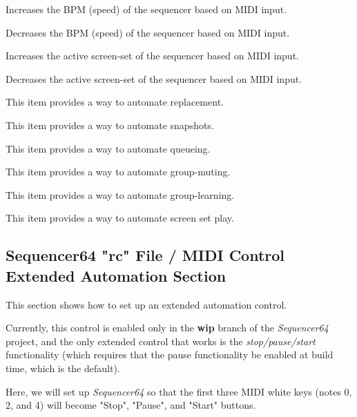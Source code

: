    Increases the BPM (speed) of the sequencer based on MIDI input.

   Decreases the BPM (speed) of the sequencer based on MIDI input.

   Increases the active screen-set of the sequencer based on MIDI input.

   Decreases the active screen-set of the sequencer based on MIDI input.

   This item provides a way to automate replacement.

   This item provides a way to automate snapshots.

   This item provides a way to automate queueing.

   This item provides a way to automate group-muting.

   This item provides a way to automate group-learning.

   This item provides a way to automate screen set play.

\subsection{Sequencer64 "rc" File / MIDI Control Extended Automation Section}
\label{subsubsec:seq64_rc_file_midi_control_extended_automation_group}

   This section shows how to set up an extended automation control.

   Currently, this control is enabled only in the \textbf{wip} branch of the
   \textsl{Sequencer64} project, and the only extended control that works is
   the \textsl{stop/pause/start} functionality (which requires that the pause
   functionality be enabled at build time, which is the default).

   Here, we will set up \textsl{Sequencer64} so that the first three MIDI
   white keys (notes 0, 2, and 4) will become "Stop", "Pause", and "Start"
   buttons.

